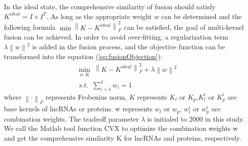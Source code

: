 \documentclass[fleqn,10pt]{wlscirep}
\begin{document}
In the ideal state, the comprehensive similarity of fusion should satisfy ${{{K}}^{ideal}} = {{I}}\times{{{I}}^T}$. As long as the appropriate weight ${w}$ can be determined and the following formula $\min \left\| {{{K}} - {{K}^{ideal}}} \right\|_F^2$ can be satisfied, the goal of multi-kernel fusion can be achieved. In order to avoid over-fitting, a regularization term $\lambda {\left\| {w} \right\|^2}$ is added in the fusion process, and the objective function can be transformed into the equation (\ref{eq:fusionObjection}):
\begin{equation}\label{eq:fusionObjection}
\begin{array}{l}
\mathop {\min }\limits_{{{w,K}}} \;\left\| {{{K}} - {{{K}}^{ideal}}} \right\|_F^2 + \lambda {\left\| {w} \right\|^2}\\
\;s.t.\;\;\sum\limits_{i = 1}^4 {{w_i}}  = 1
\end{array}
\end{equation}
where ${\left\|  \cdot  \right\|_F}$ represents Frobenius norm, ${{K}}$ represents ${{{K}}_l}$ or ${{{K}}_p}$,${{{K}}_l^i}$ or ${{{K}}_p^i}$ are base kernels of lncRNAs or proteins. {w} represents ${{w}_l}$ or ${{w}_p}$, $w_l^i$ or $w_p^i$ are combination weights. The tradeoff parameter $\lambda$ is initialed to 2000 in this study. We call the Matlab tool function CVX to optimize the combination weights {{w}} and get the comprehensive similarity {K} for lncRNAs and proteins, respectively.  
\end{document}
